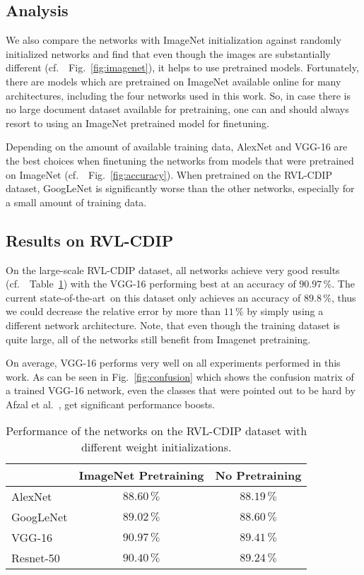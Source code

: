 \documentclass[conference]{IEEEtran}
\newcommand*{\cf}		{cf.\ }
\newcommand*{\sota}		{state-of-the-art\ }
\begin{document}
\subsection{Analysis}

We also compare the networks with ImageNet initialization against randomly initialized networks and find that even though the images are substantially different (\cf~Fig.~\ref{fig:imagenet}), it helps to use pretrained models. Fortunately, there are models which are pretrained on ImageNet available online for many architectures, including the four networks used in this work. So, in case there is no large document dataset available for pretraining, one can and should always resort to using an ImageNet pretrained model for finetuning.

Depending on the amount of available training data, AlexNet and VGG-16 are the best choices when finetuning the networks from models that were pretrained on ImageNet (\cf~Fig.~\ref{fig:accuracy}). When pretrained on the RVL-CDIP dataset, GoogLeNet is significantly worse than the other networks, especially for a small amount of training data.


\subsection{Results on RVL-CDIP}

On the large-scale RVL-CDIP dataset, all networks achieve very good results (\cf~Table~\ref{tab:accuracy_large}) with the VGG-16 performing best at an accuracy of $90.97\,\%$. The current \sota on this dataset only achieves an accuracy of $89.8\,\%$, thus we could decrease the relative error by more than $11\,\%$ by simply using a different network architecture.
Note, that even though the training dataset is quite large, all of the networks still benefit from Imagenet pretraining.

On average, VGG-16 performs very well on all experiments performed in this work. As can be seen in Fig.~\ref{fig:confusion} which shows the confusion matrix of a trained VGG-16 network, even the classes that were pointed out to be hard by Afzal et al.~\cite{afzal2015deepdocclassifier}, get significant performance boosts.


\begin{table}
\renewcommand{\arraystretch}{1.3}
\centering
\caption{Performance of the networks on the RVL-CDIP dataset with different weight initializations.}
\begin{tabular}{l|c|c}
 & ImageNet Pretraining & No Pretraining \\\hline
AlexNet & $88.60\,\%$ & $88.19\,\%$ \\\hline
GoogLeNet & $89.02\,\%$ & $88.60\,\%$ \\\hline
VGG-16 & $90.97\,\%$ & $89.41\,\%$ \\\hline
Resnet-50 & $90.40\,\%$ & $89.24\,\%$
\end{tabular}
\label{tab:accuracy_large}
\end{table}
\end{document}
